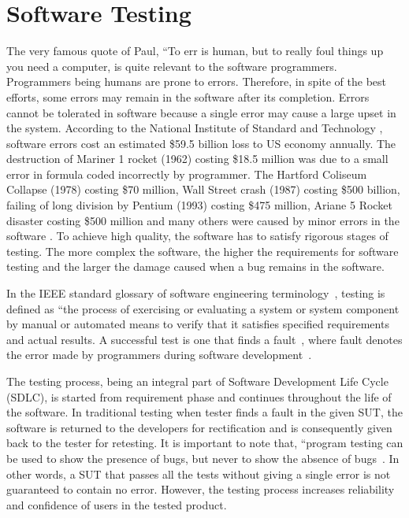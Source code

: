 \chapter{Software Testing}
\label{chap:softwareTesting}

The very famous quote of Paul, ``To err is human, but to really foul things up you need a computer, is quite relevant to the software programmers. Programmers being humans are prone to errors. Therefore, in spite of the best efforts, some errors may remain in the software after its completion.  Errors cannot be tolerated in software because a single error may cause a large upset in the system. According to the National Institute of Standard and Technology \cite{Tassey2002}, software errors cost an estimated \$59.5 billion loss to US economy annually. The destruction of Mariner 1 rocket (1962) costing \$18.5 million was due to a small error in formula coded incorrectly by programmer. The Hartford Coliseum Collapse (1978) costing \$70 million, Wall Street crash (1987) costing \$500 billion, failing of long division by Pentium (1993) costing \$475 million, Ariane 5 Rocket disaster costing \$500 million and many others were caused by minor errors in the software \cite{toweysoftware}. To achieve high quality, the software has to satisfy rigorous stages of testing. The more complex the software, the higher the requirements for software testing and the larger the damage caused when a bug remains in the software.

In the IEEE standard glossary of software engineering terminology~\cite{american1984}, testing is defined as ``the process of exercising or evaluating a system or system component by manual or automated means to verify that it satisfies specified requirements and actual results. A successful test is one that finds a fault~\cite{Myers1979}, where fault denotes the error made by programmers during software development~\cite{american1984}.

The testing process, being an integral part of Software Development Life Cycle (SDLC), is started from requirement phase and continues throughout the life of the software. In traditional testing when tester finds a fault in the given SUT, the software is returned to the developers for rectification and is consequently given back to the tester for retesting. It is important to note that, ``program testing can be used to show the presence of bugs, but never to show the absence of bugs~\cite{Dijkstra1972}. In other words, a SUT that passes all the tests without giving a single error is not guaranteed to contain no error. However, the testing process increases reliability and confidence of users in the tested product. 

